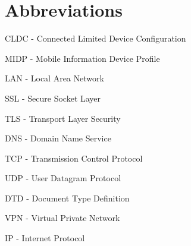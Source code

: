 \documentclass[11pt,twoside,a4paper]{book}
\begin{document}
%


\appendix



\chapter{Abbreviations}

\begin{description}
\item CLDC - Connected Limited Device Configuration
\item MIDP - Mobile Information Device Profile
\item LAN - Local Area Network
\item SSL - Secure Socket Layer
\item TLS - Transport Layer Security
\item DNS - Domain Name Service
\item TCP - Transmission Control Protocol
\item UDP - User Datagram Protocol
\item DTD - Document Type Definition
 \item VPN - Virtual Private Network
\item IP - Internet Protocol
\end{description}










\end{document}

